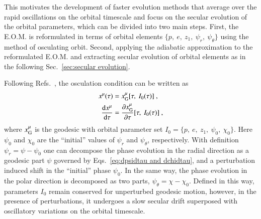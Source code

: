 \documentclass[aps,prx,reprint,superscriptaddress,nofootinbib,longbibliography]{revtex4-1}
\begin{document}
This motivates the development of faster evolution methods that average over the rapid oscillations on the orbital timescale and focus on the secular evolution of the orbital parameters, which can be divided into two main steps. First, the E.O.M. is reformulated in terms of orbital elements $\{p,\ e,\ z_{1}, \ \psi_r, \ \psi_\theta\}$ using the method of osculating orbit. Second, applying the adiabatic approximation to the reformulated E.O.M. and extracting secular evolution of orbital elements as in the following Sec.~\ref{sec:secular evolution}.

Following Refs.~\cite{PhysRevD.83.044037,PhysRevD.77.044013}, the osculation condition can be written as  
\begin{equation}
\begin{aligned}
     x^{\mu}(\tau)&=x_{\rm G}^{\mu}[\tau,\ I_{0}(\tau)]\ , \\ 
    \dv{x^{\mu}}{\tau}&=\pdv{x_{\rm G}^{\mu}}{\tau}[\tau,\ I_{0}(\tau)] \ ,
\end{aligned}
\label{eq:x xG}
\end{equation}
where $x^{\mu}_{\rm G}$ is the geodesic with orbital parameter set $I_{0}=\{p,\ e,\ z_{1},\ \psi_{0},\ \chi_{0}\}$. Here $\psi_{0}$ and $\chi_{0}$ are the “initial” values of  $\psi_r$ and $\psi_\theta$, respectively. With definition $\psi_{r}=\psi-\psi_{0}$ one can decompose the phase evolution in the radial direction as a geodesic part $\psi$ governed by Eqs.~\eqref{eq:dpsidtau and dchidtau}, and a perturbation induced shift in the “initial” phase $\psi_{0}$. In the same way, the phase evolution in the polar direction is decomposed as two parts, $\psi_{\theta}=\chi-\chi_{0}$. Defined in this way, parameters
$I_{0}$ remain conserved for unperturbed geodesic motion, however, in the presence of perturbations, it undergoes a slow secular drift superposed with oscillatory variations on the orbital timescale.  
\end{document}
